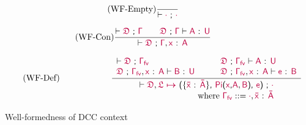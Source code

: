 \begin{figure}
\renewcommand{\arraystretch}{1.3}
	\begin{equation}
		\tag{WF-Empty}
		\frac{ }{\vdash \target{\cdot}\ \textsf{;}\ \target{\cdot}}
	\end{equation}\vspace{0.1cm}

	\begin{equation}
		\tag{WF-Con}
		\frac{\vdash {\color{purple}{\mathsf{\mathfrak{D}}}}\ \textsf{;}\ {\color{purple}{\mathsf{\Gamma}}} \qquad {\color{purple}{\mathsf{\mathfrak{D}}}}\ \textsf{;}\ {\color{purple}{\mathsf{\Gamma}}} \vdash \mathsf{\color{purple}A \color{black} \textsf{ : } \color{purple}U}}
		{\vdash {\color{purple}{\mathsf{\mathfrak{D}}}}\ \textsf{;}\ {\color{purple}{\mathsf{\Gamma}}}, \mathsf{\color{purple}x \color{black} \textsf{ : } \color{purple}A}}
	\end{equation}

	\begin{equation}
		\tag{WF-Def}
		\qquad\qquad\qquad
		\frac{
			\begin{array}{l  l}
				\vdash \target{\fdef}\ \textsf{;}\ \target{\Gamma_{fv}} \qquad & 
				\target{\fdef}\ \textsf{;}\ \target{\Gamma_{fv}} \vdash \itemtype{A}{U} \\
				\target{\fdef}\ \textsf{;}\ \target{\Gamma_{fv}}, \itemtype{x}{A} \vdash \itemtype{B}{U} \qquad &
			\target{\fdef}\ \textsf{;}\ \target{\Gamma_{fv}}, \itemtype{x}{A} \vdash \itemtype{e}{B}

			\end{array}}
		{
			\begin{array}{r}
			\vdash \target{\fdef}, \itemdef{\target{\flabel}}{\itemtype{\bar{x}}{\bar{A}}}{\targetpi{x}{A}{B}}{\target{e}}\ \textsf{;}\ \target{\cdot} \\
			\text{where } \target{\Gamma_{fv}} ::= \target{\cdot}, \itemtype{\bar{x}}{\bar{A}}
			\end{array}
		}
	\end{equation}
	\caption{Well-formedness of DCC context}
    \label{fig:dcc context}
\end{figure}

